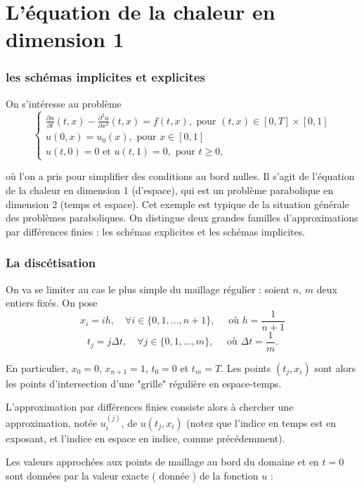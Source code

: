 \documentclass{beamer}
\begin{document}
  \section{L’équation de la chaleur en dimension 1}
 \begin{frame}   
  \frametitle{les schémas implicites et explicites}
On s'intéresse au problème
\[\left\{\begin{array}{l}
\displaystyle \frac{\partial u}{\partial t}(t,x) - \frac{\partial^2 u}{\partial x^2}(t,x) = f(t,x), \mbox{ pour }(t,x)\in [0,T]\times  [0,1]\\
u(0,x)=u_0(x), \mbox{ pour } x\in [0,1]\\
u(t,0)=0 \mbox{ et }  u(t,1) = 0, \mbox{ pour } t\geqslant 0,
\end{array}\right.\]


où l'on a pris pour simplifier des conditions au bord nulles. Il s'agit de l'équation de la chaleur en dimension 1 (d'espace), qui est un problème parabolique en dimension 2 (temps et espace). Cet exemple est typique de la situation générale des problèmes paraboliques. On distingue deux grandes familles d'approximations par différences finies : les schémas explicites et les schémas implicites.
  \end{frame}
  
  
  \begin{frame}   
  \frametitle{La discétisation}
 On va se limiter au cas le plus simple du maillage régulier : soient $n$, $m$ deux entiers fixés. On pose
  \[x_i =i h,\quad \forall i\in\{0,1,...,n+1\},\quad \mbox{ où } h=\frac 1{n+1}\]
\[t_j =j \Delta t,\quad \forall j\in\{0,1,...,m\},\quad \mbox{ où } \Delta t= \frac{1}{m} .\]

  En particulier, $x_0 = 0$, $x_{n+1} = 1$, $t_0 = 0$ et $t_{m} = T$. Les points $(t_j,x_i)$
sont alors les points d'intersection d'une "grille" régulière en espace-temps.

L'approximation par différences finies consiste alors à chercher une approximation, notée $u_i^{(j)}$, de $u(t_j,x_i)$ (notez que l'indice en temps est en exposant, et l'indice en espace en indice, comme précédemment).

Les valeurs approchées aux points de maillage au bord du domaine et en $t = 0$ sont données par la valeur exacte ( donnée ) de la fonction $u$ :

\end{frame}
 
\end{document}
